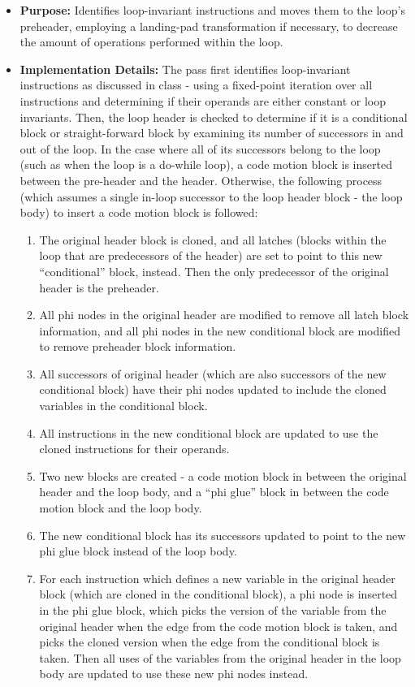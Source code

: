 \documentclass{article}
\begin{document}
\begin{itemize}

	\item \textbf{Purpose:} Identifies loop-invariant instructions and moves them to the loop's preheader, employing a landing-pad transformation if necessary, to decrease the amount of operations performed within the loop.

	\item \textbf{Implementation Details:} The pass first identifies loop-invariant instructions as discussed in class - using a fixed-point iteration over all instructions and determining if their operands are either constant or loop invariants. Then, the loop header is checked to determine if it is a conditional block or straight-forward block by examining its number of successors in and out of the loop. In the case where all of its successors belong to the loop (such as when the loop is a do-while loop), a code motion block is inserted between the pre-header and the header. Otherwise, the following process (which assumes a single in-loop successor to the loop header block - the loop body) to insert a code motion block is followed:
	      \begin{enumerate}
		      \item The original header block is cloned, and all latches (blocks within the loop that are predecessors of the header) are set to point to this new ``conditional'' block, instead. Then the only predecessor of the original header is the preheader.
		      \item All phi nodes in the original header are modified to remove all latch block information, and all phi nodes in the new conditional block are modified to remove preheader block information.
		      \item All successors of original header (which are also successors of the new conditional block) have their phi nodes updated to include the cloned variables in the conditional block.
		      \item All instructions in the new conditional block are updated to use the cloned instructions for their operands.
		      \item Two new blocks are created - a code motion block in between the original header and the loop body, and a ``phi glue'' block in between the code motion block and the loop body.
		      \item The new conditional block has its successors updated to point to the new phi glue block instead of the loop body.
		      \item For each instruction which defines a new variable in the original header block (which are cloned in the conditional block), a phi node is inserted in the phi glue block, which picks the version of the variable from the original header when the edge from the code motion block is taken, and picks the cloned version when the edge from the conditional block is taken. Then all uses of the variables from the original header in the loop body are updated to use these new phi nodes instead.
	      \end{enumerate}


\end{itemize}
\end{document}
